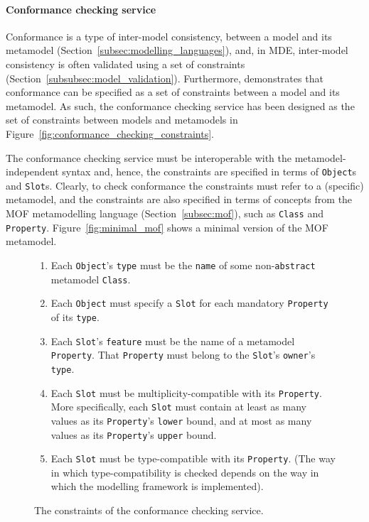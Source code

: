 \paragraph{Conformance checking service} Conformance is a type of inter-model consistency, between a model and its metamodel (Section~\ref{subsec:modelling_languages}), and, in MDE, inter-model consistency is often validated using a set of constraints (Section~\ref{subsubsec:model_validation}). Furthermore, \cite{paige07metamodel} demonstrates that conformance can be specified as a set of constraints between a model and its metamodel. As such, the conformance checking service has been designed as the set of constraints between models and metamodels in Figure~\ref{fig:conformance_checking_constraints}.

The conformance checking service must be interoperable with the metamodel-independent syntax and, hence, the constraints are specified in terms of \texttt{Ob\-je\-ct}s and \texttt{Sl\-ot}s. Clearly, to check conformance the constraints must refer to a (specific) metamodel, and the constraints are also specified in terms of concepts from the MOF metamodelling language (Section~\ref{subsec:mof}), such as \texttt{Class} and \texttt{Property}. Figure~\ref{fig:minimal_mof} shows a minimal version of the MOF metamodel.


\begin{figure}[htbp]
	\begin{framed}
	  \begin{enumerate}
			\item Each \texttt{Ob\-je\-ct}'s \texttt{ty\-pe} must be the \texttt{na\-me} of some non-\texttt{ab\-str\-act} metamodel \texttt{Cl\-a\-ss}.
			\item Each \texttt{Ob\-je\-ct} must specify a \texttt{Sl\-ot} for each mandatory \texttt{Pr\-op\-er\-ty} of its \texttt{ty\-pe}.
			\item Each \texttt{Sl\-ot}'s \texttt{fe\-at\-u\-re} must be the name of a metamodel \texttt{Pr\-op\-er\-ty}. That \texttt{Pr\-op\-er\-ty} must belong to the \texttt{Sl\-ot}'s \texttt{ow\-n\-er}'s \texttt{ty\-pe}.
			\item Each \texttt{Sl\-ot} must be multiplicity-compatible with its \texttt{Pr\-op\-er\-ty}. More specifically, each \texttt{Sl\-ot} must contain at least as many values as its \texttt{Pr\-op\-er\-ty}'s \texttt{lo\-w\-er} bound, and at most as many values as its \texttt{Pr\-op\-er\-ty}'s \texttt{up\-p\-er} bound.
		  \item Each \texttt{Sl\-ot} must be type-compatible with its \texttt{Pr\-op\-er\-ty}. (The way in which type-compatibility is checked depends on the way in which the modelling framework is implemented).
		\end{enumerate}
	\end{framed}
  \caption{The constraints of the conformance checking service.}
  \label{fig:minimal_generic_metamodel}
\end{figure}


